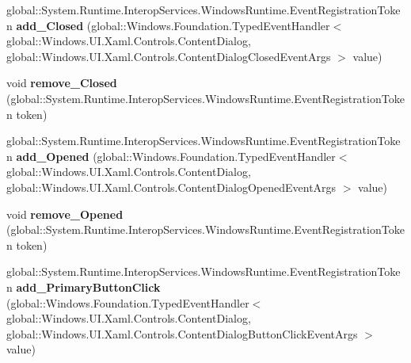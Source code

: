 \begin{DoxyCompactItemize}
\item 
\mbox{\label{interface_windows_1_1_u_i_1_1_xaml_1_1_controls_1_1_i_content_dialog_a0beaba38f02c9d4794fb77352515c019}} 
global\+::\+System.\+Runtime.\+Interop\+Services.\+Windows\+Runtime.\+Event\+Registration\+Token {\bfseries add\+\_\+\+Closed} (global\+::\+Windows.\+Foundation.\+Typed\+Event\+Handler$<$ global\+::\+Windows.\+U\+I.\+Xaml.\+Controls.\+Content\+Dialog, global\+::\+Windows.\+U\+I.\+Xaml.\+Controls.\+Content\+Dialog\+Closed\+Event\+Args $>$ value)
\item 
\mbox{\label{interface_windows_1_1_u_i_1_1_xaml_1_1_controls_1_1_i_content_dialog_a0f292cccc855269673def1275049e487}} 
void {\bfseries remove\+\_\+\+Closed} (global\+::\+System.\+Runtime.\+Interop\+Services.\+Windows\+Runtime.\+Event\+Registration\+Token token)
\item 
\mbox{\label{interface_windows_1_1_u_i_1_1_xaml_1_1_controls_1_1_i_content_dialog_aab9c98aeae39301ee05dd02009bff07b}} 
global\+::\+System.\+Runtime.\+Interop\+Services.\+Windows\+Runtime.\+Event\+Registration\+Token {\bfseries add\+\_\+\+Opened} (global\+::\+Windows.\+Foundation.\+Typed\+Event\+Handler$<$ global\+::\+Windows.\+U\+I.\+Xaml.\+Controls.\+Content\+Dialog, global\+::\+Windows.\+U\+I.\+Xaml.\+Controls.\+Content\+Dialog\+Opened\+Event\+Args $>$ value)
\item 
\mbox{\label{interface_windows_1_1_u_i_1_1_xaml_1_1_controls_1_1_i_content_dialog_ad3492a494e11fd90309979866a567dfb}} 
void {\bfseries remove\+\_\+\+Opened} (global\+::\+System.\+Runtime.\+Interop\+Services.\+Windows\+Runtime.\+Event\+Registration\+Token token)
\item 
\mbox{\label{interface_windows_1_1_u_i_1_1_xaml_1_1_controls_1_1_i_content_dialog_ab6c7f4c09786d73f59362e42d3204ae4}} 
global\+::\+System.\+Runtime.\+Interop\+Services.\+Windows\+Runtime.\+Event\+Registration\+Token {\bfseries add\+\_\+\+Primary\+Button\+Click} (global\+::\+Windows.\+Foundation.\+Typed\+Event\+Handler$<$ global\+::\+Windows.\+U\+I.\+Xaml.\+Controls.\+Content\+Dialog, global\+::\+Windows.\+U\+I.\+Xaml.\+Controls.\+Content\+Dialog\+Button\+Click\+Event\+Args $>$ value)

\end{DoxyCompactItemize}
